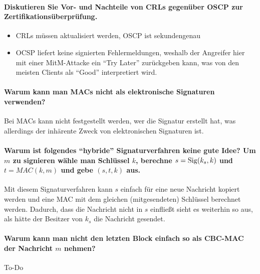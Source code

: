 		\paragraph{Diskutieren Sie Vor- und Nachteile von CRLs gegenüber OSCP zur Zertifikationsüberprüfung.}
			\begin{itemize}
				\item CRLs müssen aktualisiert werden, OSCP ist sekundengenau
				\item OCSP liefert keine signierten Fehlermeldungen, weshalb der Angreifer hier mit einer MitM-Attacke ein \enquote{Try Later} zurückgeben kann, was von den meisten Clients als \enquote{Good} interpretiert wird.
			\end{itemize}

		\paragraph{Warum kann man MACs nicht als elektronische Signaturen verwenden?}
			Bei MACs kann nicht festgestellt werden, wer die Signatur erstellt hat, was allerdings der inhärente Zweck von elektronischen Signaturen ist.

		\paragraph{Warum ist folgendes \enquote{hybride} Signaturverfahren keine gute Idee? Um \(m\) zu signieren wähle man Schlüssel \(k\), berechne \(s = \operatorname{Sig}(k_s, k) \) und \(t = MAC(k, m)\) und gebe \((s, t, k)\) aus.}
			Mit diesem Signaturverfahren kann \(s\) einfach für eine neue Nachricht kopiert werden und eine MAC mit dem gleichen (mitgesendeten) Schlüssel berechnet werden. Dadurch, dass die Nachricht nicht in \(s\) einfließt sieht es weiterhin so aus, als hätte der Besitzer von \(k_s\) die Nachricht gesendet.

		\paragraph{Warum kann man nicht den letzten Block einfach so als CBC-MAC der Nachricht \(m\) nehmen?}
			To-Do 

